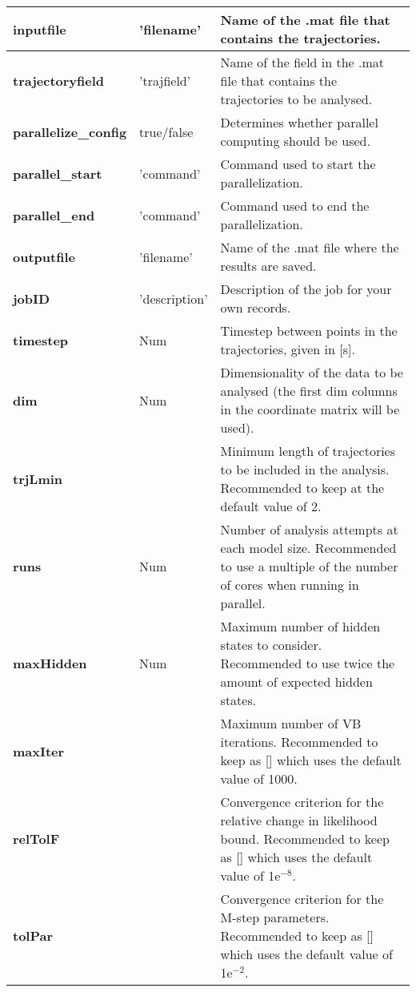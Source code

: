 \begin{longtable}{|m{}|>{\centering\arraybackslash}m{}|m{}|}
\textbf{inputfile}						&	  'filename'						&		Name of the .mat file that contains the trajectories.\\ [0.5ex]  \hline 
\textbf{trajectoryfield}				&	  'trajfield'							&		Name of the field in the .mat file that contains the trajectories to be analysed.\\ [0.5ex]  \hline 
\textbf{parallelize\_config}		&	  true/false						&		Determines whether parallel computing should be used.\\ [0.5ex]  \hline 
\textbf{parallel\_start}				&	  'command'						&		Command used to start the parallelization.\\ [0.5ex]  \hline 
\textbf{parallel\_end}				&	  'command'						&		Command used to end the parallelization.\\ [0.5ex]  \hline 
\textbf{outputfile	}					&	  'filename'						&		Name of the .mat file where the results are saved.\\ [0.5ex]  \hline 
\textbf{jobID}							&	  'description'					&		Description of the job for your own records.\\ [0.5ex]  \hline 
\textbf{timestep}						&	  Num								&		Timestep between points in the trajectories, given in [s].\\ [0.5ex]  \hline 
\textbf{dim}								&	  Num								&		Dimensionality of the data to be analysed (the first dim columns in the coordinate matrix will be used).\\ [0.5ex]  \hline 
\textbf{trjLmin}						&	  2									&		Minimum length of trajectories to be included in the analysis. Recommended to keep at the default value of 2.\\ [0.5ex]  \hline 
\textbf{runs}							&	  Num								&		Number of analysis attempts at each model size. Recommended to use a multiple of the number of cores when running in parallel.\\ [0.5ex]  \hline 
\textbf{maxHidden}					&	  Num								&		Maximum number of hidden states to consider. Recommended to use twice the amount of expected hidden states.\\ [0.5ex]  \hline 
\textbf{maxIter}						&	  []									&		Maximum number of VB iterations. Recommended to keep as [] which uses the default value of 1000.\\ [0.5ex]  \hline 
\textbf{relTolF}						&	  []									&		Convergence criterion for the relative change in likelihood bound. Recommended to keep as [] which uses the default value of 1e$^{-8}$.\\[0.5ex]  \hline 
\textbf{tolPar}							&	  []									&		Convergence criterion for the M-step parameters. Recommended to keep as [] which uses the default value of 1e$^{-2}$.\\[0.5ex]  \hline 

\end{longtable}

